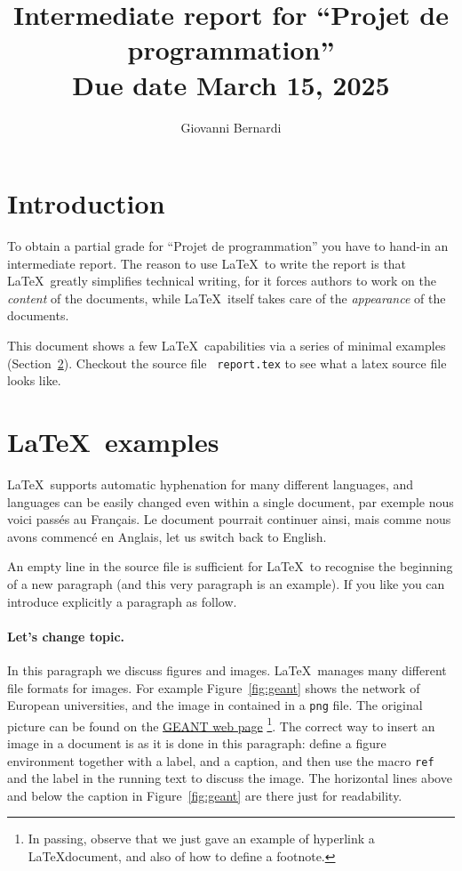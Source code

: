 \documentclass{article}
\title{%
  Intermediate report for ``Projet de programmation''\\
  Due date March 15, 2025%
}
\author{Giovanni Bernardi}
\newcommand{\latex}{\LaTeX}
\begin{document}
\maketitle


\section{Introduction}
To obtain a partial grade for \foreignlanguage{french}{``Projet de programmation''}
you have to hand-in an intermediate report.
The reason to use \latex\ to write the report is that \latex\
greatly simplifies technical writing, for it forces authors
to work on the {\em  content} of the documents, while \latex\
itself takes care of the {\em appearance} of the documents.

This document shows a few \latex\  capabilities via a series of minimal
examples (Section~\ref{sec:latex-examples}). Checkout the source file {\tt
  report.tex} to see what a latex source file looks like.

\section{\latex\  examples}
\label{sec:latex-examples}
\latex\  supports automatic hyphenation for many different languages,
and languages can be easily changed even within a single document,
\selectlanguage{french}
par exemple nous voici passés au Français. Le document pourrait continuer ainsi,
mais comme nous avons commencé en Anglais,
\selectlanguage{english}
let us switch back to English.

An empty line in the source file is sufficient for \latex\  to
recognise the beginning of a new paragraph (and this very
paragraph is an example). If you like you can introduce explicitly
a paragraph as follow.

\paragraph{Let's change topic.} In this paragraph we discuss figures
and images. \latex\  manages many different file formats for images.
For example Figure~\ref{fig:geant} shows the network of European universities,
and the image in contained in a {\tt png} file.
The original picture can be found on the \href{https://www.geant.org/}{GEANT web page}
\footnote{In passing, observe that we just gave an example of hyperlink a
\latex document, and also of how to define a footnote.}.
The correct way to insert an image in a document is as it is done in this
paragraph: define a figure environment together with a label, and a caption,
and then use the macro {\tt ref} and the label in the running text
to discuss the image. The horizontal lines above and below the caption in
Figure~\ref{fig:geant} are there just for readability.
\end{document}
